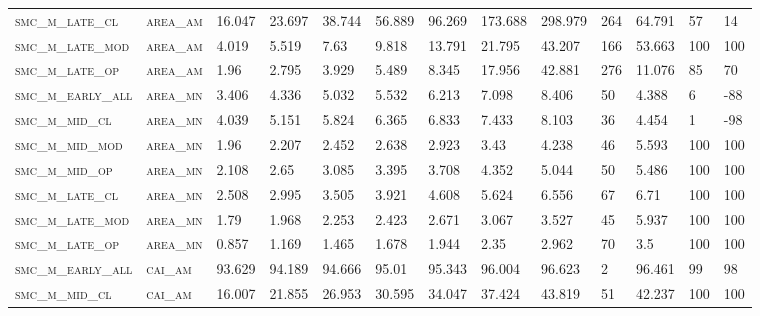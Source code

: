 \begin{landscape}
\begin{center}
\begin{footnotesize}
\begin{longtable}{lllllllllllll}
\textsc{smc\_m\_late\_cl  } & \textsc{area\_am  }   & 16.047   & 23.697   & 38.744   & 56.889   & 96.269   & 173.688  & 298.979  & 264    & 64.791        & 57            & 14       \\
\textsc{smc\_m\_late\_mod } & \textsc{area\_am  }   & 4.019    & 5.519    & 7.63     & 9.818    & 13.791   & 21.795   & 43.207   & 166    & 53.663        & 100           & 100      \\
\textsc{smc\_m\_late\_op  } & \textsc{area\_am  }   & 1.96     & 2.795    & 3.929    & 5.489    & 8.345    & 17.956   & 42.881   & 276    & 11.076        & 85            & 70       \\
\textsc{smc\_m\_early\_all} & \textsc{area\_mn  }   & 3.406    & 4.336    & 5.032    & 5.532    & 6.213    & 7.098    & 8.406    & 50     & 4.388         & 6             & -88      \\
\textsc{smc\_m\_mid\_cl   } & \textsc{area\_mn  }   & 4.039    & 5.151    & 5.824    & 6.365    & 6.833    & 7.433    & 8.103    & 36     & 4.454         & 1             & -98      \\
\textsc{smc\_m\_mid\_mod  } & \textsc{area\_mn  }   & 1.96     & 2.207    & 2.452    & 2.638    & 2.923    & 3.43     & 4.238    & 46     & 5.593         & 100           & 100      \\
\textsc{smc\_m\_mid\_op   } & \textsc{area\_mn  }   & 2.108    & 2.65     & 3.085    & 3.395    & 3.708    & 4.352    & 5.044    & 50     & 5.486         & 100           & 100      \\
\textsc{smc\_m\_late\_cl  } & \textsc{area\_mn  }   & 2.508    & 2.995    & 3.505    & 3.921    & 4.608    & 5.624    & 6.556    & 67     & 6.71          & 100           & 100      \\
\textsc{smc\_m\_late\_mod } & \textsc{area\_mn  }   & 1.79     & 1.968    & 2.253    & 2.423    & 2.671    & 3.067    & 3.527    & 45     & 5.937         & 100           & 100      \\
\textsc{smc\_m\_late\_op  } & \textsc{area\_mn  }   & 0.857    & 1.169    & 1.465    & 1.678    & 1.944    & 2.35     & 2.962    & 70     & 3.5           & 100           & 100      \\
\textsc{smc\_m\_early\_all} & \textsc{cai\_am   }   & 93.629   & 94.189   & 94.666   & 95.01    & 95.343   & 96.004   & 96.623   & 2      & 96.461        & 99            & 98       \\
\textsc{smc\_m\_mid\_cl   } & \textsc{cai\_am   }   & 16.007   & 21.855   & 26.953   & 30.595   & 34.047   & 37.424   & 43.819   & 51     & 42.237        & 100           & 100      \\

\end{longtable}
\end{footnotesize}
\end{center}
\end{landscape}
